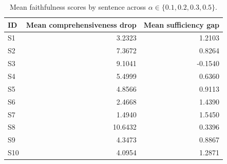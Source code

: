 \begin{table}[htbp]
\centering
\caption{Mean faithfulness scores by sentence across $\alpha\in\{0.1,0.2,0.3,0.5\}$.}
\label{tab:faithfulness-sentence}
\begin{tabular}{lrr}
\toprule
ID & Mean comprehensiveness drop & Mean sufficiency gap \\
\midrule
S1 & 3.2323 & 1.2103 \\
S2 & 7.3672 & 0.8264 \\
S3 & 9.1041 & -0.1540 \\
S4 & 5.4999 & 0.6360 \\
S5 & 4.8566 & 0.9113 \\
S6 & 2.4668 & 1.4390 \\
S7 & 1.4940 & 1.5450 \\
S8 & 10.6432 & 0.3396 \\
S9 & 4.3473 & 0.8867 \\
S10 & 4.0954 & 1.2871 \\
\bottomrule
\end{tabular}
\end{table}
